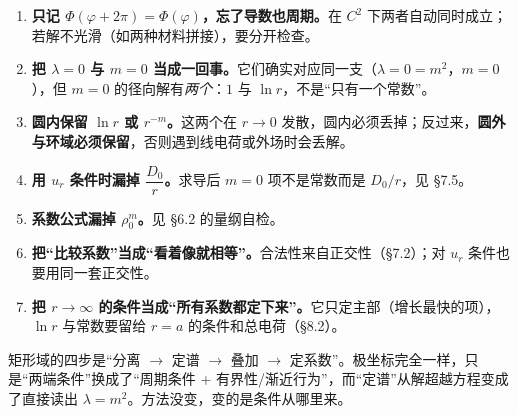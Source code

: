 \documentclass[11pt]{ctexart}
\let\origsubhdr\subhdr
\renewcommand{\subhdr}[1]{\par\needspace{3\baselineskip}\origsubhdr{#1}}
\let\orighdr\hdr
\renewcommand{\hdr}[2]{\par\needspace{6\baselineskip}\orighdr{#1}{#2}}
\begin{document}

\begin{enumerate}[label=(\arabic*)]
  \item \textbf{只记 $\Phi(\varphi+2\pi)=\Phi(\varphi)$，忘了导数也周期。}在 $C^2$ 下两者自动同时成立；若解不光滑（如两种材料拼接），要分开检查。
  \item \textbf{把 $\lambda=0$ 与 $m=0$ 当成一回事。}它们确实对应同一支（$\lambda=0=m^2$，$m=0$），但 $m=0$ 的径向解有\emph{两个}：$1$ 与 $\ln r$，不是“只有一个常数”。
  \item \textbf{圆内保留 $\ln r$ 或 $r^{-m}$。}这两个在 $r\to0$ 发散，圆内必须丢掉；反过来，\textbf{圆外与环域必须保留}，否则遇到线电荷或外场时会丢解。
  \item \textbf{用 $u_r$ 条件时漏掉 $\dfrac{D_0}{r}$。}求导后 $m=0$ 项不是常数而是 $D_0/r$，见 \S7.5。
  \item \textbf{系数公式漏掉 $\rho_0^m$。}见 \S6.2 的量纲自检。
  \item \textbf{把“比较系数”当成“看着像就相等”。}合法性来自正交性（\S7.2）；对 $u_r$ 条件也要用同一套正交性。
  \item \textbf{把 $r\to\infty$ 的条件当成“所有系数都定下来”。}它只定主部（增长最快的项），$\ln r$ 与常数要留给 $r=a$ 的条件和总电荷（\S8.2）。
\end{enumerate}


矩形域的四步是“分离 $\to$ 定谱 $\to$ 叠加 $\to$ 定系数”。极坐标完全一样，只是“两端条件”换成了“周期条件 + 有界性/渐近行为”，而“定谱”从解超越方程变成了直接读出 $\lambda=m^2$。方法没变，变的是条件从哪里来。

\needspace{0.44\textheight}
\label{sec:s10}
\end{document}
